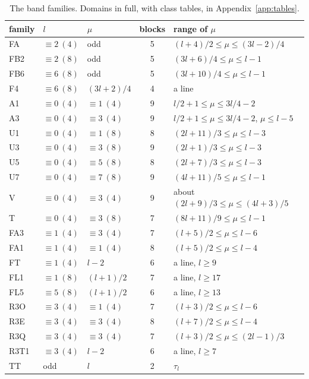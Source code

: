 \documentclass[11pt]{amsart}
\theoremstyle{plain}
\theoremstyle{definition}
\theoremstyle{remark}
\begin{document}
\begin{table}[ht]
\centering\small
\caption{The band families. Domains in full, with class tables, in
Appendix~\ref{app:tables}.}\label{tab:families}
\begin{tabular}{@{}lllcl@{}}
\toprule
family & $l$ & $\mu$ & blocks & range of $\mu$ \\
\midrule
FA & $\equiv 2 \ (4)$ & odd & 5 & $(l+4)/2 \le \mu \le (3l-2)/4$ \\
FB2 & $\equiv 2 \ (8)$ & odd & 5 & $(3l+6)/4 \le \mu \le l-1$ \\
FB6 & $\equiv 6 \ (8)$ & odd & 5 & $(3l+10)/4 \le \mu \le l-1$ \\
F4 & $\equiv 6 \ (8)$ & $(3l+2)/4$ & 4 & a line \\
A1 & $\equiv 0 \ (4)$ & $\equiv 1 \ (4)$ & 9 & $l/2+1 \le \mu \le 3l/4-2$ \\
A3 & $\equiv 0 \ (4)$ & $\equiv 3 \ (4)$ & 9 & $l/2+1 \le \mu \le 3l/4-2$, $\mu \le l-5$ \\
U1 & $\equiv 0 \ (4)$ & $\equiv 1 \ (8)$ & 8 & $(2l+11)/3 \le \mu \le l-3$ \\
U3 & $\equiv 0 \ (4)$ & $\equiv 3 \ (8)$ & 9 & $(2l+1)/3 \le \mu \le l-3$ \\
U5 & $\equiv 0 \ (4)$ & $\equiv 5 \ (8)$ & 8 & $(2l+7)/3 \le \mu \le l-3$ \\
U7 & $\equiv 0 \ (4)$ & $\equiv 7 \ (8)$ & 9 & $(4l+11)/5 \le \mu \le l-1$ \\
V & $\equiv 0 \ (4)$ & $\equiv 3 \ (4)$ & 9 & about $(2l+9)/3 \le \mu \le (4l+3)/5$ \\
T & $\equiv 0 \ (4)$ & $\equiv 3 \ (8)$ & 7 & $(8l+11)/9 \le \mu \le l-1$ \\
FA3 & $\equiv 1 \ (4)$ & $\equiv 3 \ (4)$ & 7 & $(l+5)/2 \le \mu \le l-6$ \\
FA1 & $\equiv 1 \ (4)$ & $\equiv 1 \ (4)$ & 8 & $(l+5)/2 \le \mu \le l-4$ \\
FT & $\equiv 1 \ (4)$ & $l-2$ & 6 & a line, $l \ge 9$ \\
FL1 & $\equiv 1 \ (8)$ & $(l+1)/2$ & 7 & a line, $l \ge 17$ \\
FL5 & $\equiv 5 \ (8)$ & $(l+1)/2$ & 6 & a line, $l \ge 13$ \\
R3O & $\equiv 3 \ (4)$ & $\equiv 1 \ (4)$ & 7 & $(l+3)/2 \le \mu \le l-6$ \\
R3E & $\equiv 3 \ (4)$ & $\equiv 3 \ (4)$ & 8 & $(l+7)/2 \le \mu \le l-4$ \\
R3Q & $\equiv 3 \ (4)$ & $\equiv 3 \ (4)$ & 7 & $(l+3)/2 \le \mu \le (2l-1)/3$ \\
R3T1 & $\equiv 3 \ (4)$ & $l-2$ & 6 & a line, $l \ge 7$ \\
TT & odd & $l$ & 2 & $\tau_l$ \\
\bottomrule
\end{tabular}
\end{table}
\end{document}
